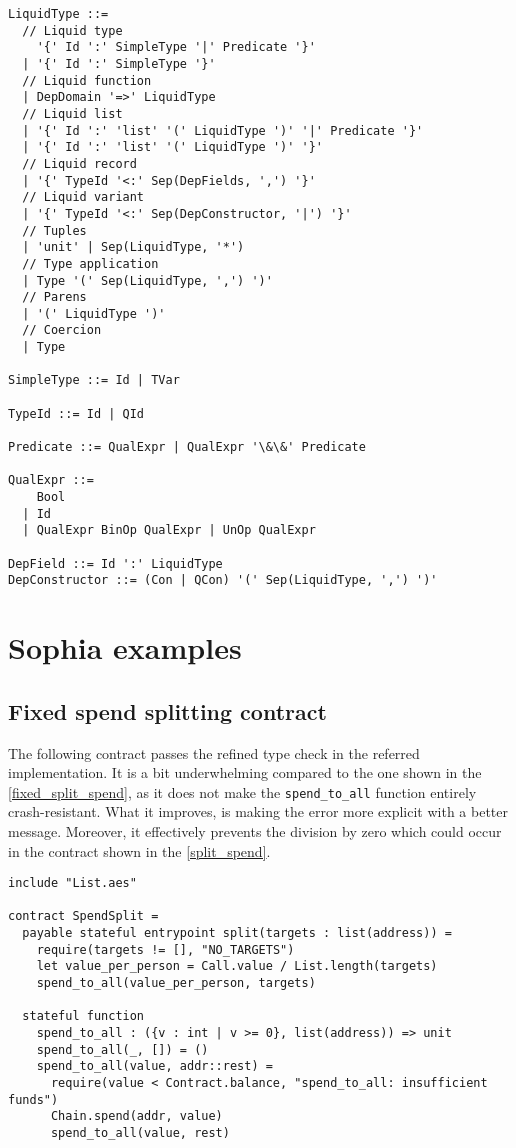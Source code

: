 \begin{lstlisting}[language=bnf]
LiquidType ::=
  // Liquid type
    '{' Id ':' SimpleType '|' Predicate '}'
  | '{' Id ':' SimpleType '}'
  // Liquid function
  | DepDomain '=>' LiquidType
  // Liquid list
  | '{' Id ':' 'list' '(' LiquidType ')' '|' Predicate '}'
  | '{' Id ':' 'list' '(' LiquidType ')' '}'
  // Liquid record
  | '{' TypeId '<:' Sep(DepFields, ',') '}'
  // Liquid variant
  | '{' TypeId '<:' Sep(DepConstructor, '|') '}'
  // Tuples
  | 'unit' | Sep(LiquidType, '*')
  // Type application
  | Type '(' Sep(LiquidType, ',') ')'
  // Parens
  | '(' LiquidType ')'
  // Coercion
  | Type

SimpleType ::= Id | TVar

TypeId ::= Id | QId

Predicate ::= QualExpr | QualExpr '\&\&' Predicate

QualExpr ::=
    Bool
  | Id
  | QualExpr BinOp QualExpr | UnOp QualExpr

DepField ::= Id ':' LiquidType
DepConstructor ::= (Con | QCon) '(' Sep(LiquidType, ',') ')'
\end{lstlisting}

\chapter{Sophia examples}

\section{Fixed spend splitting contract}
\label{fixed_spend_split}

The following contract passes the refined type check in the referred
implementation. It is a bit underwhelming compared to the one shown in the
\autoref{fixed_split_spend}, as it does not make the \texttt{spend\_to\_all}
function entirely crash-resistant. What it improves, is making the error more
explicit with a better message. Moreover, it effectively prevents the division
by zero which could occur in the contract shown in the \autoref{split_spend}.

\begin{lstlisting}[language=sophia]
include "List.aes"

contract SpendSplit =
  payable stateful entrypoint split(targets : list(address)) =
    require(targets != [], "NO_TARGETS")
    let value_per_person = Call.value / List.length(targets)
    spend_to_all(value_per_person, targets)

  stateful function
    spend_to_all : ({v : int | v >= 0}, list(address)) => unit
    spend_to_all(_, []) = ()
    spend_to_all(value, addr::rest) =
      require(value < Contract.balance, "spend_to_all: insufficient funds")
      Chain.spend(addr, value)
      spend_to_all(value, rest)
\end{lstlisting}